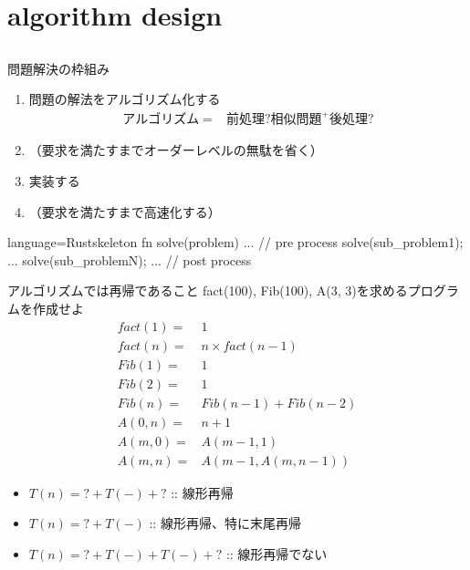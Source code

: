 \documentclass{beamer}
\subtitle{練習問題}
\begin{document}
\begin{frame}[fragile]{}
\titlepage
\end{frame}

\section{algorithm design}		%
\subsection{}

\begin{frame}[fragile]{問題解決の枠組み}{}
\begin{enumerate}%
\item 問題の解法をアルゴリズム化する\footnotemark
\begin{align*}
アルゴリズム = & 前処理? 相似問題^{+} 後処理?
\end{align*}
\item （要求を満たすまでオーダーレベルの無駄を省く）
\item 実装する
\item （要求を満たすまで高速化する）
\end{enumerate}

\vfill

\begin{codeof}{language=Rust}{skeleton}
fn solve(problem) {
  ...   // pre process
  solve(sub_problem1);
  ...
  solve(sub_problemN);
  ...    // post process
}
\end{codeof}

\end{frame}

\begin{frame}[fragile]{アルゴリズムでは再帰であること}{}
fact(100), Fib(100), A(3, 3)を求めるプログラムを作成せよ
\begin{align*}
fact(1) =& 1 \\
fact(n) =& n \times fact(n - 1)\\
Fib(1) =& 1 \\
Fib(2) =& 1 \\
Fib(n) =& Fib(n - 1) + Fib(n -2) \\
A(0, n) =& n + 1 \\
A(m, 0) =& A(m - 1, 1) \\
A(m, n) =& A(m - 1, A(m, n - 1))
\end{align*}

\begin{itemize}%
\item $T(n) = ? + T(-) + ?$ :: 線形再帰
\item $T(n) = ? + T(-)$ :: 線形再帰、特に末尾再帰
\item $T(n) = ? + T(-) + T(-) + ?$ :: 線形再帰でない
\end{itemize}
\end{frame}
\end{document}
